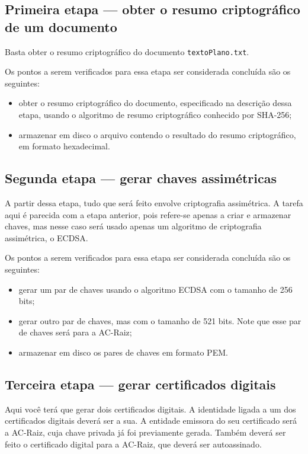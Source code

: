 \documentclass{article}
\begin{document}
\subsection{Primeira etapa ---
    obter o resumo criptográfico de um documento}\label{subsec:step1}

Basta obter o resumo criptográfico do documento \texttt{textoPlano.txt}.

Os pontos a serem verificados para essa etapa ser considerada concluída são os
seguintes:

\begin{itemize}
  \item obter o resumo criptográfico do documento, especificado na descrição
      dessa etapa, usando o algoritmo de resumo criptográfico conhecido por
        SHA-256;
  \item armazenar em disco o arquivo contendo o resultado do resumo
      criptográfico, em formato hexadecimal.
\end{itemize}

\subsection{Segunda etapa --- gerar chaves assimétricas}\label{subsec:step2}

A partir dessa etapa, tudo que será feito envolve criptografia assimétrica. A
tarefa aqui é parecida com a etapa anterior, pois refere-se apenas a criar e
armazenar chaves, mas nesse caso será usado apenas um algoritmo de criptografia
assimétrica, o ECDSA\@.

Os pontos a serem verificados para essa etapa ser considerada concluída são os
seguintes:

\begin{itemize}
  \item gerar um par de chaves usando o algoritmo ECDSA com o tamanho de 256
      bits;
  \item gerar outro par de chaves, mas com o tamanho de 521 bits. Note que esse
      par de chaves será para a AC-Raiz;
  \item armazenar em disco os pares de chaves em formato PEM.
\end{itemize}

\subsection{Terceira etapa --- gerar certificados digitais}\label{subsec:step3}

Aqui você terá que gerar dois certificados digitais. A identidade ligada a um
dos certificados digitais deverá ser a sua. A entidade emissora do seu
certificado será a AC-Raiz, cuja chave privada já foi previamente gerada.
Também deverá ser feito o certificado digital para a AC-Raiz, que deverá ser
autoassinado.
\end{document}
